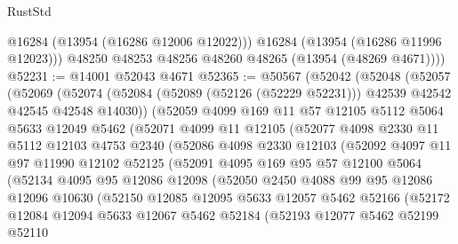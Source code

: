 \begin{lexlean}{RustStd}
\begin{coremodule}
            @16284
            (@13954 (@16286 @12006 @12022)))
          @16284
          (@13954 (@16286 @11996 @12023)))
        @48250
        @48253
        @48256
        @48260
        @48265
        (@13954 (@48269 @4671))))
@52231 := @14001 @52043 @4671
@52365 := @50567
    (@52042
      (@52048
        (@52057
          (@52069
            (@52074 (@52084 (@52089 (@52126 (@52229 @52231))) @42539 @42542 @42545 @42548 @14030))
            (@52059
              @4099
              @169
              @11
              @57
              @12105
              @5112
              @5064
              @5633
              @12049
              @5462
              (@52071
                @4099
                @11
                @12105
                (@52077
                  @4098
                  @2330
                  @11
                  @5112
                  @12103
                  @4753
                  @2340
                  (@52086
                    @4098
                    @2330
                    @12103
                    (@52092
                      @4097
                      @11
                      @97
                      @11990
                      @12102
                      @52125
                      (@52091
                        @4095
                        @169
                        @95
                        @57
                        @12100
                        @5064
                        (@52134
                          @4095
                          @95
                          @12086
                          @12098
                          (@52050
                            @2450
                            @4088
                            @99
                            @95
                            @12086
                            @12096
                            @10630
                            (@52150
                              @12085
                              @12095
                              @5633
                              @12057
                              @5462
                              @52166
                              (@52172
                                @12084
                                @12094
                                @5633
                                @12067
                                @5462
                                @52184
                                (@52193
                                  @12077
                                  @5462
                                  @52199
                                  @52110

\end{coremodule}
\end{lexlean}
